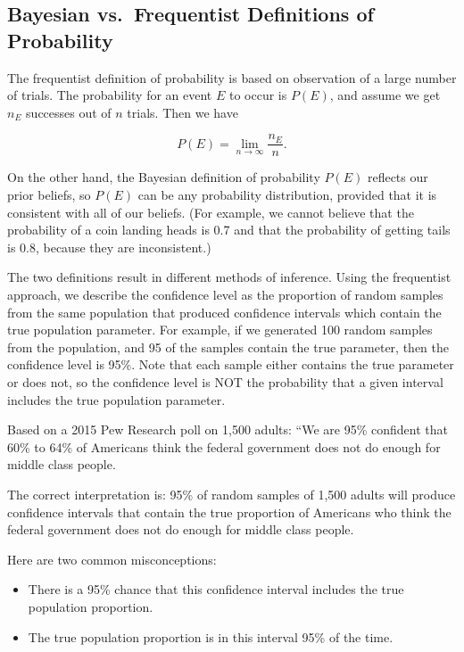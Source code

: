 \documentclass[]{book}
\theoremstyle{definition}
\theoremstyle{definition}
\theoremstyle{definition}
\theoremstyle{remark}
\let\BeginKnitrBlock\begin \let\EndKnitrBlock\end
\begin{document}
\subsection{Bayesian vs.~Frequentist Definitions of
Probability}\label{bayesian-vs.frequentist-definitions-of-probability}

The frequentist definition of probability is based on observation of a
large number of trials. The probability for an event \(E\) to occur is
\(P(E)\), and assume we get \(n_E\) successes out of \(n\) trials. Then
we have

\begin{equation}
P(E) = \lim_{n \rightarrow \infty} \dfrac{n_E}{n}.
\end{equation}

On the other hand, the Bayesian definition of probability \(P(E)\)
reflects our prior beliefs, so \(P(E)\) can be any probability
distribution, provided that it is consistent with all of our beliefs.
(For example, we cannot believe that the probability of a coin landing
heads is 0.7 and that the probability of getting tails is 0.8, because
they are inconsistent.)

The two definitions result in different methods of inference. Using the
frequentist approach, we describe the confidence level as the proportion
of random samples from the same population that produced confidence
intervals which contain the true population parameter. For example, if
we generated 100 random samples from the population, and 95 of the
samples contain the true parameter, then the confidence level is 95\%.
Note that each sample either contains the true parameter or does not, so
the confidence level is NOT the probability that a given interval
includes the true population parameter.

\BeginKnitrBlock{example}
\protect\hypertarget{exm:unnamed-chunk-7}{}\label{exm:unnamed-chunk-7} Based
on a 2015 Pew Research poll on 1,500 adults: ``We are 95\% confident
that 60\% to 64\% of Americans think the federal government does not do
enough for middle class people.
\EndKnitrBlock{example}

The correct interpretation is: 95\% of random samples of 1,500 adults
will produce confidence intervals that contain the true proportion of
Americans who think the federal government does not do enough for middle
class people.

Here are two common misconceptions:

\begin{itemize}
\item
  There is a 95\% chance that this confidence interval includes the true
  population proportion.
\item
  The true population proportion is in this interval 95\% of the time.
\end{itemize}
\end{document}
